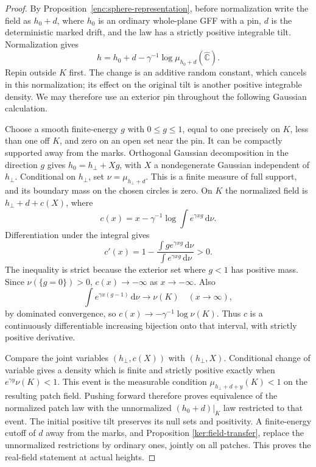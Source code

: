 \documentclass[11pt]{article}
\numberwithin{equation}{section}
\theoremstyle{definition}
\theoremstyle{remark}
\newcommand{\1}{\mathbf 1}
\begin{document}
\begin{proof}
By Proposition~\ref{enc:sphere-representation}, before normalization
write the field as \(h_0+d\), where \(h_0\) is an ordinary whole-plane
GFF with a pin, \(d\) is the deterministic marked drift, and the law
has a strictly positive integrable tilt.  Normalization gives
\[
 h=h_0+d-\gamma^{-1}\log\mu_{h_0+d}(\widehat{\mathbb C}).
\]
Repin outside \(K\) first.  The change is an additive random constant,
which cancels in this normalization; its effect on the original tilt
is another positive integrable density.  We may therefore use an
exterior pin throughout the following Gaussian calculation.

Choose a smooth finite-energy \(g\) with \(0\le g\le1\), equal to
one precisely on \(K\), less than one off \(K\), and zero on an
open set near the pin.  It can be compactly supported away from the
marks.  Orthogonal Gaussian decomposition in the direction \(g\)
gives \(h_0=h_\perp+Xg\), with \(X\) a nondegenerate Gaussian
independent of \(h_\perp\).  Conditional on \(h_\perp\), set
\(\nu=\mu_{h_\perp+d}\).  This is a finite measure of full support,
and its boundary mass on the chosen circles is zero.  On \(K\) the
normalized field is \(h_\perp+d+c(X)\), where
\[
 c(x)=x-\gamma^{-1}\log\int e^{\gamma xg}\,\mathrm d\nu.
\]
Differentiation under the integral gives
\[
 c'(x)=1-
 \frac{\int g e^{\gamma xg}\,\mathrm d\nu}
      {\int e^{\gamma xg}\,\mathrm d\nu}>0.
\]
The inequality is strict because the exterior set where \(g<1\)
has positive mass.  Since \(\nu(\{g=0\})>0\), \(c(x)\to-\infty\)
as \(x\to-\infty\).  Also
\[
 \int e^{\gamma x(g-1)}\,\mathrm d\nu\longrightarrow\nu(K)
 \quad(x\to\infty),
\]
by dominated convergence, so
\(c(x)\to-\gamma^{-1}\log\nu(K)\).
Thus \(c\) is a continuously differentiable increasing bijection
onto that interval, with strictly positive derivative.

Compare the joint variables \((h_\perp,c(X))\) with
\((h_\perp,X)\).  Conditional change of variable gives a density
which is finite and strictly positive exactly when
\(e^{\gamma y}\nu(K)<1\).  This event is the measurable condition
\(\mu_{h_\perp+d+y}(K)<1\) on the resulting patch field.  Pushing
forward therefore proves equivalence of the normalized patch law
with the unnormalized \((h_0+d)|_K\) law restricted to that event.
The initial positive tilt preserves its null sets and positivity.
A finite-energy cutoff of \(d\) away from the marks, and Proposition
\ref{ker:field-transfer}, replace the unnormalized restrictions by
ordinary ones, jointly on all patches.  This proves the real-field
statement at actual heights.


\end{proof}
\end{document}
